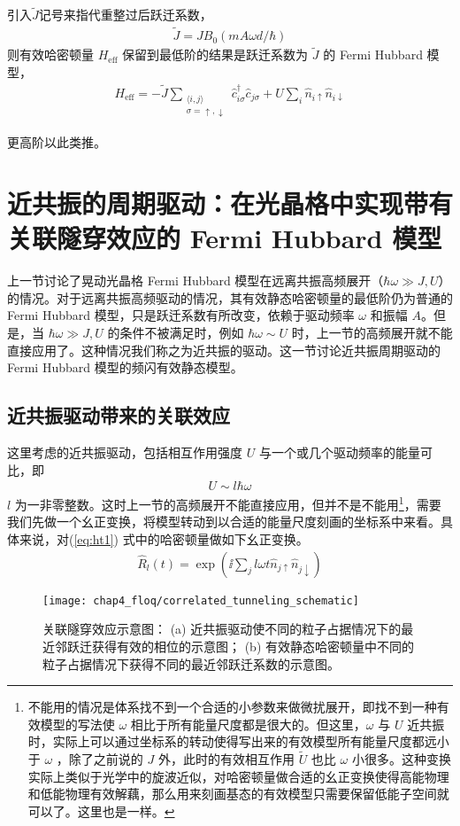 引入$\tilde{J}$记号来指代重整过后跃迁系数，
\begin{align}
\tilde{J} = JB_0(mA\omega d/\hbar) 
\end{align}
则有效哈密顿量 $H_{\text{eff}}$ 保留到最低阶的结果是跃迁系数为 $\tilde{J}$ 的 Fermi Hubbard 模型，
\begin{align}
H_{\text{eff}} = -\tilde{J} \sum_{\substack{\langle i,j\rangle \\ \sigma = \uparrow,\downarrow}} \hat{c}_{i\sigma}^{\dagger}\hat{c}_{j\sigma}+U\sum_i\hat{n}_{i\uparrow}\hat{n}_{i\downarrow}
\end{align}

更高阶以此类推。





\section{近共振的周期驱动：在光晶格中实现带有关联隧穿效应的 Fermi Hubbard 模型}\label{sec:floq:resona}

上一节讨论了晃动光晶格 Fermi Hubbard 模型在远离共振高频展开（$\hbar\omega\gg J, U$）的情况。对于远离共振高频驱动的情况，其有效静态哈密顿量的最低阶仍为普通的 Fermi Hubbard 模型，只是跃迁系数有所改变，依赖于驱动频率 $\omega$ 和振幅 $A$。但是，当 $\hbar\omega\gg J, U$ 的条件不被满足时，例如 $\hbar\omega\sim U$ 时，上一节的高频展开就不能直接应用了。这种情况我们称之为近共振的驱动。这一节讨论近共振周期驱动的 Fermi Hubbard 模型的频闪有效静态模型。

\subsection{近共振驱动带来的关联效应}
这里考虑的近共振驱动，包括相互作用强度 $U$ 与一个或几个驱动频率的能量可比，即
\begin{align}
U\sim l\hbar\omega
\end{align}
$l$ 为一非零整数。这时上一节的高频展开不能直接应用，但并不是不能用\footnote{不能用的情况是体系找不到一个合适的小参数来做微扰展开，即找不到一种有效模型的写法使 $\omega$ 相比于所有能量尺度都是很大的。但这里，$\omega$ 与 $U$ 近共振时，实际上可以通过坐标系的转动使得写出来的有效模型所有能量尺度都远小于 $\omega$ ，除了之前说的 $J$ 外，此时的有效相互作用 $\tilde{U}$ 也比 $\omega$ 小很多。这种变换实际上类似于光学中的旋波近似，对哈密顿量做合适的幺正变换使得高能物理和低能物理有效解藕，那么用来刻画基态的有效模型只需要保留低能子空间就可以了。这里也是一样。}，需要我们先做一个幺正变换，将模型转动到以合适的能量尺度刻画的坐标系中来看。具体来说，对(\ref{eq:ht1}) 式中的哈密顿量做如下幺正变换。
\begin{align}
\hat{R}_l(t) = \exp(\ii\sum_jl\omega t\hat{n}_{j\uparrow}\hat{n}_{j\downarrow})
\end{align}
\begin{figure}[t]
\centering
\texttt{[image: chap4\_floq/correlated\_tunneling\_schematic]}
\caption{关联隧穿效应示意图：
(a) 近共振驱动使不同的粒子占据情况下的最近邻跃迁获得有效的相位的示意图；
(b) 有效静态哈密顿量中不同的粒子占据情况下获得不同的最近邻跃迁系数的示意图。}
\label{fig:floq:corrtunn}
\end{figure}

